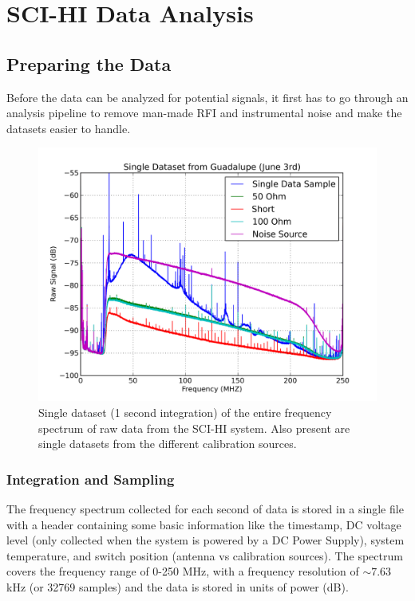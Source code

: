\chapter{SCI-HI Data Analysis}\label{Ch:Data}



\section{Preparing the Data}

Before the data can be analyzed for potential signals, it first has to go through an analysis pipeline to remove man-made RFI and instrumental noise and make the datasets easier to handle. 

\begin{figure}[htb]
\begin{center}
\includegraphics[width=0.88\linewidth]{Data_analysis/figures/single_raw_guad_june03.png}
\caption{Single dataset (1 second integration) of the entire frequency spectrum of raw data from the SCI-HI system. Also present are single datasets from the different calibration sources. }
\label{Fig:raw_data}
\end{center}
\end{figure}


\subsection{Integration and Sampling}\label{Sec:int}

The frequency spectrum collected for each second of data is stored in a single file with a header containing some basic information like the timestamp, DC voltage level (only collected when the system is powered by a DC Power Supply), system temperature, and switch position (antenna vs calibration sources). The spectrum covers the frequency range of 0-250 MHz, with a frequency resolution of $\sim 7.63$ kHz (or 32769 samples) and the data is stored in units of power (dB).

